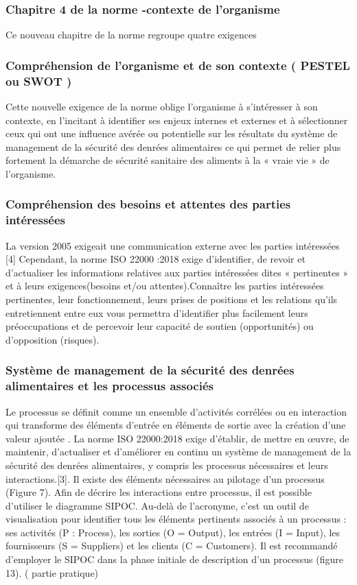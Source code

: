 \begin{spacing}{1.2}
\subsubsection{Chapitre 4 de la norme -contexte de l’organisme }
Ce nouveau chapitre de la norme regroupe quatre exigences
\subsubsection{Compréhension de l’organisme et de son contexte ( PESTEL ou SWOT ) }
Cette nouvelle  exigence de la norme oblige l’organisme à s’intéresser à son contexte, en l’incitant à identifier ses enjeux internes et externes et à sélectionner ceux qui ont une influence avérée ou potentielle sur les résultats du système de management de la sécurité des denrées alimentaires  ce qui permet de relier  plus fortement la démarche de sécurité sanitaire des aliments à la « vraie vie » de l’organisme.
\subsubsection{Compréhension des besoins et attentes des parties intéressées}
La  version 2005 exigeait  une communication externe avec les parties intéressées [4] Cependant, la norme ISO 22000 :2018 exige  d’identifier, de revoir et d’actualiser les informations relatives aux parties intéressées dites « pertinentes »  et à leurs exigences(besoins et/ou attentes).Connaître les parties intéressées pertinentes, leur fonctionnement, leurs prises de positions et les relations qu’ils entretiennent entre eux vous permettra d’identifier plus facilement leurs préoccupations et de percevoir leur capacité de soutien (opportunités) ou d’opposition (risques).
\subsubsection{Système de management de la sécurité des denrées alimentaires et les processus associés }

Le processus se définit comme un ensemble d’activités corrélées ou en interaction qui transforme des éléments d’entrée en éléments de sortie avec la création d’une valeur ajoutée .
La norme ISO 22000:2018 exige d’établir, de mettre en œuvre, de maintenir, d’actualiser et d’améliorer en continu un système de management de la sécurité des denrées alimentaires, y compris les processus nécessaires et leurs interactions.[3]. Il existe des éléments nécessaires au pilotage d’un processus (Figure 7). Afin de décrire les interactions entre processus, il est possible d’utiliser le diagramme SIPOC. Au-delà de l’acronyme, c’est un outil de visualisation pour identifier tous les éléments pertinents associés à un processus : ses activités (P : Process), les sorties (O = Output), les entrées (I = Input), les fournisseurs (S = Suppliers) et les clients (C = Customers). Il est recommandé d’employer le SIPOC dans la phase initiale de description d’un processus (figure 13). ( partie pratique)


\end{spacing}

